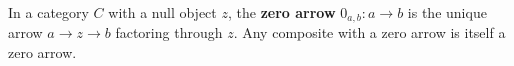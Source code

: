 In a category $C$ with a null object $z$, the \textbf{zero arrow} $0_{a,b}: a \rightarrow b$ is the unique arrow $a \rightarrow z \rightarrow b$ factoring through $z$. Any composite with a zero arrow is itself a zero arrow.